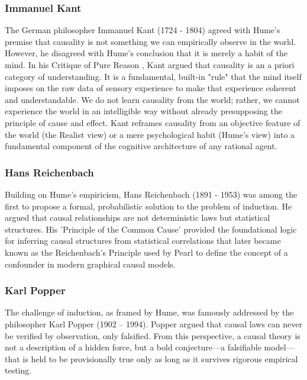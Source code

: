 \subsubsection{Immanuel Kant}

The German philosopher Immanuel Kant (1724 - 1804) agreed with Hume's premise that causality is not something we can empirically observe in the world. However, he disagreed with Hume's conclusion that it is merely a habit of the mind. In his Critique of Pure Reason \cite{kant2024critique}, Kant argued that causality is an a priori category of understanding. It is a fundamental, built-in "rule" that the mind itself imposes on the raw data of sensory experience to make that experience coherent and understandable. We do not learn causality from the world; rather, we cannot experience the world in an intelligible way without already presupposing the principle of cause and effect. Kant reframes causality from an objective feature of the world (the Realist view) or a mere psychological habit (Hume's view) into a fundamental component of the cognitive architecture of any rational agent. 

\subsubsection{Hans Reichenbach}

Building on Hume's empiricism, Hans Reichenbach (1891 - 1953) was among the first to propose a formal, probabilistic solution to the problem of induction. He argued that causal relationships are not deterministic laws but statistical structures. His 'Principle of the Common Cause' provided the foundational logic for inferring causal structures from statistical correlations\cite{reichenbach1991direction} that later became known as the Reichenbach's Principle used by Pearl to define the concept of a confounder in modern graphical causal models\cite{pearl2000causality}.

\subsubsection{Karl Popper}

The challenge of induction, as framed by Hume, was famously addressed by the philosopher Karl Popper  (1902 – 1994). Popper argued that causal laws can never be verified by observation, only falsified. From this perspective, a causal theory is not a description of a hidden force, but a bold conjecture—a falsifiable model—that is held to be provisionally true only as long as it survives rigorous empirical testing\cite{popper2005logic}.


